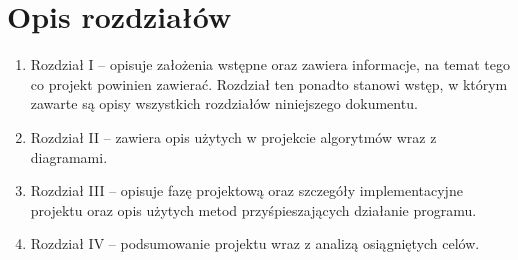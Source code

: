 \section{Opis rozdziałów}
\begin{enumerate}
	\item Rozdział I – opisuje założenia wstępne oraz zawiera informacje, na temat tego co projekt powinien zawierać. Rozdział ten ponadto stanowi wstęp, w którym zawarte są opisy wszystkich rozdziałów niniejszego dokumentu.
	\item Rozdział II – zawiera opis użytych w projekcie algorytmów wraz z diagramami.
	\item Rozdział III – opisuje fazę  projektową oraz szczegóły implementacyjne projektu oraz opis użytych metod przyśpieszających działanie programu.
	\item Rozdział IV – podsumowanie projektu wraz z analizą osiągniętych celów.
\end{enumerate}




